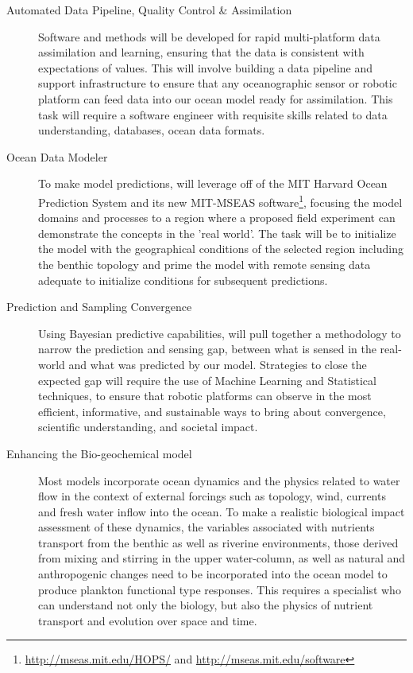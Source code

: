 \begin{description}

\item[Automated Data Pipeline, Quality Control \& Assimilation]
  Software and methods will be developed for rapid multi-platform data
  assimilation and learning, ensuring that the data is consistent with
  expectations of values. This will involve building a data pipeline
  and support infrastructure to ensure that any oceanographic sensor
  or robotic platform can feed data into our ocean model ready for
  assimilation. This task will require a software engineer with
  requisite skills related to data understanding, databases, ocean
  data formats.

\item[Ocean Data Modeler] To make model predictions, \pro will
  leverage off of the MIT Harvard Ocean Prediction System and its new
  MIT-MSEAS software\footnote{\url{http://mseas.mit.edu/HOPS/} and
    \url{http://mseas.mit.edu/software}}, focusing the model domains
  and processes to a region where a proposed field experiment can
  demonstrate the concepts in the 'real world'. The task will be to
  initialize the model with the geographical conditions of the
  selected region including the benthic topology and prime the model
  with remote sensing data adequate to initialize conditions for
  subsequent predictions.

\item[Prediction and Sampling Convergence] Using Bayesian predictive
  capabilities, \pro will pull together a methodology to narrow the
  prediction and sensing gap, between what is sensed in the real-world
  and what was predicted by our model. Strategies to close the
  expected gap will require the use of Machine Learning and
  Statistical techniques, to ensure that robotic platforms can observe
  in the most efficient, informative, and sustainable ways to bring
  about convergence, scientific understanding, and societal impact.

\item[Enhancing the Bio-geochemical model] Most models incorporate ocean
  dynamics and the physics related to water flow in the context of
  external forcings such as topology, wind, currents and fresh water
  inflow into the ocean. To make a realistic biological impact
  assessment of these dynamics, the variables associated with nutrients
  transport from the benthic as well as riverine environments, those
  derived from mixing and stirring in the upper water-column, as well as
  natural and anthropogenic changes need to be incorporated into the
  ocean model to produce plankton functional type responses. This
  requires a specialist who can understand not only the biology, but
  also the physics of nutrient transport and evolution over space and
  time.


\end{description}
